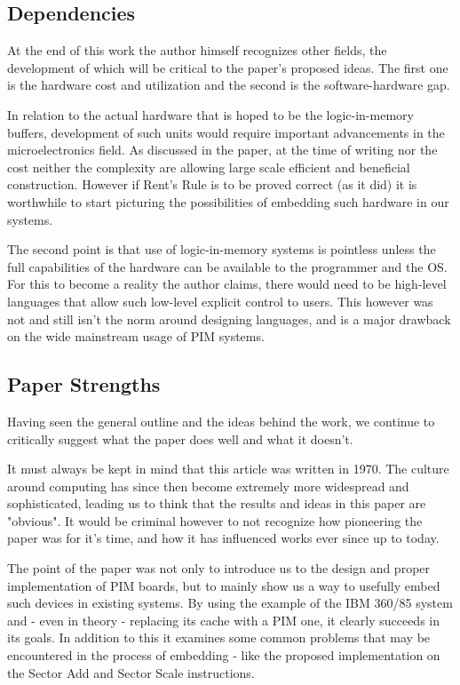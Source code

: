 \documentclass[12pt,twocolumn]{IEEEtran}
\begin{document}
\subsection{Dependencies}
At the end of this work the author himself recognizes other fields, the development of which will be critical to the paper's proposed ideas. The first one is the hardware cost and utilization and the second is the software-hardware gap.

 In relation to the actual hardware that is hoped to be the logic-in-memory buffers, development of such units would require important advancements in the microelectronics field. As discussed in the paper, at the time of writing nor the cost neither the complexity are allowing large scale efficient and beneficial construction. However if Rent's Rule is to be proved correct (as it did) it is worthwhile to start picturing the possibilities of embedding such hardware in our systems. 

The second point is that use of logic-in-memory systems is pointless unless the full capabilities of the hardware can be available to the programmer and the OS. For this to become a reality the author claims, there would need to be high-level languages that allow such low-level explicit control to users. This however was not and still isn't the norm around designing languages, and is a major drawback on the wide mainstream usage of PIM systems.

\subsection{Paper Strengths}
Having seen the general outline and the ideas behind the work, we continue to critically suggest what the paper does well and what it doesn't.

It must always be kept in mind that this article was written in 1970. The culture around computing has since then become extremely more widespread and sophisticated, leading us to think that the results and ideas in this paper are "obvious". It would be criminal however to not recognize how pioneering the paper was for it's time, and how it has influenced works ever since up to today. 

The point of the paper was not only to introduce us to the design and proper implementation of PIM boards, but to mainly show us a way to usefully embed such devices in existing systems. By using the example of the IBM 360/85 system and - even in theory - replacing its cache with a PIM one, it clearly succeeds in its goals. In addition to this it examines some common problems that may be encountered in the process of embedding - like the proposed implementation on the Sector Add and Sector Scale instructions. 
\end{document}

